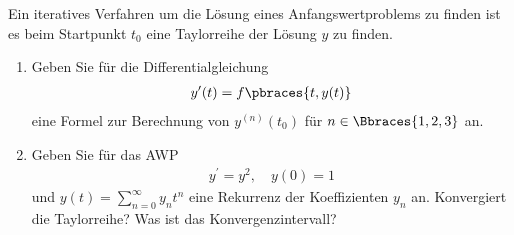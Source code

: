 \begin{exercise}
    Ein iteratives Verfahren um die Lösung eines Anfangswertproblems zu finden ist es beim Startpunkt $t_0$ eine Taylorreihe der Lösung $y$ zu finden.
    \begin{enumerate}[label = \alph*)]
        \item Geben Sie für die Differentialgleichung
        \begin{align*}
            y^\prime(t) = f\pbraces{t,y(t)}
        \end{align*}
        eine Formel zur Berechnung von $y^{(n)}(t_0)$ für $n \in \Bbraces{1,2,3}$ an.

        \item Geben Sie für das AWP
        \begin{align*}
            y^\prime = y^2, \quad y(0) = 1
        \end{align*}
        und $y(t) = \sum_{n = 0}^\infty y_n t^n$ eine Rekurrenz der Koeffizienten $y_n$ an. Konvergiert die Taylorreihe? Was ist das Konvergenzintervall?
    \end{enumerate}
\end{exercise}

